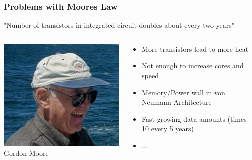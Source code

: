 \documentclass{beamer}
\begin{document}
\begin{frame}
	\frametitle{Problems with Moores Law}
	"Number of transistors in integrated circuit doubles about every two years"
	\vspace*{0.5cm}
	\begin{columns}
		\begin{column}{0.3\textwidth}
			\includegraphics[width=1.0\textwidth]{img/gordon_moore.jpg}
			Gordon Moore
		\end{column}
		\begin{column}{0.66\textwidth}
				\begin{itemize}
				\item More transistors lead to more heat
				\item Not enough to increase cores and speed
				\item Memory/Power wall in von Neumann Architecture
				\item Fast growing data amounts (times 10 every 5 years)
				\item ...
			\end{itemize}
		\end{column}
	\end{columns}

\end{frame}
\end{document}
